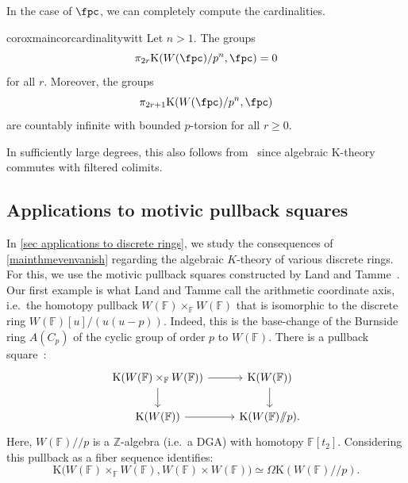 \documentclass[english,10pt]{amsart}
\newcommand{\field}{\mathbb{F}}
\theoremstyle{definition}
\numberwithin{equation}{section}
\newcommand{\mmod}{/\!\!/}
\newcommand{\sslash}{\mmod}
\newcommand{\z}{\mathbb{Z}}
\begin{document}
In the case of $\fpc$, we can completely compute the cardinalities. 

\begin{restatable}{corox}{maincorcardinalitywitt}\label{cor k-theory of truncated witts is odd}
Let $n> 1$. The groups 
\[\pi_{2r} \mathrm{K}(W(\fpc)/p^n,\fpc) = 0\]
for all $r$. Moreover, the groups 
\[\pi_{2r+1}\mathrm{K}(W(\fpc)/p^n,\fpc)\]
are countably infinite with bounded $p$-torsion for all $r\geq 0$.
\end{restatable}
In sufficiently large degrees, this also follows from~\cite[Theorem~1.4]{AKN24} since algebraic K-theory commutes with filtered colimits. 


\subsection{Applications to motivic pullback squares}\label{subsec intro on motivic pullbacks}

In \autoref{sec applications to discrete rings}, we study the consequences of \autoref{mainthmevenvanish} regarding the algebraic $K$-theory of various discrete rings. 
For this, we use the motivic pullback squares constructed by Land and Tamme~\cite{land2023kthrypushouts}. 
Our first example is what Land and Tamme call the arithmetic coordinate axis, i.e.\ the homotopy pullback $W(\field) \times_{\field} W(\field)$ that is isomorphic to the discrete ring $W(\field)[u]/(u(u-p))$. 
Indeed, this is the base-change of the Burnside ring $A(C_p)$ of the cyclic group of order $p$ to $W(\field)$. There is a pullback square~\cite[Example~4.31]{land2023kthrypushouts}:
\begin{equation*}\label{diag motivic pullback square}
\begin{tikzcd}
\mathrm{K}(W(\field) \times_{\field} W(\field)) \ar[r] \ar[d] & \mathrm{K}( W(\field))  \ar[d] \\
\mathrm{K}(W(\field)) \ar[r] & \mathrm{K}(W(\field) \sslash p).
\end{tikzcd}
\end{equation*}
Here, $W(\field)\sslash p$ is a $\z$-algebra (i.e.\ a DGA) with homotopy $\field[t_2]$. Considering this pullback as a fiber sequence identifies:
\begin{equation}\label{eq relative kthry arithmetic coordinate axis}
\mathrm{K}\big(W(\field) \times_{\field}
W(\field), W(\field) \times  W(\field)\big) \simeq  \Omega \mathrm{K}(W(\field)\sslash p).
\end{equation}
\end{document}
